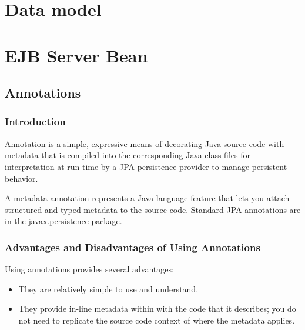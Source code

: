 
\section{Data model}

\section{EJB Server Bean}

\subsection{Annotations}
\subsubsection{Introduction}
Annotation is a simple, expressive means of decorating Java source code with
metadata that is compiled into the corresponding Java class files for
interpretation at run time by a JPA persistence provider to manage persistent
behavior.

A metadata annotation represents a Java language feature that lets you attach
structured and typed metadata to the source code. Standard JPA annotations are in
the javax.persistence package.

\subsubsection{Advantages and Disadvantages of Using Annotations}
Using annotations provides several advantages:
\begin{itemize}
\item They are relatively simple to use and understand.
\item They provide in-line metadata within with the code that it describes; you do not need to replicate the source code context of where the metadata applies.
\end{itemize}

